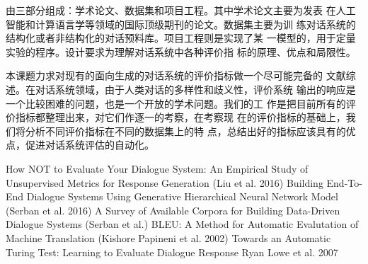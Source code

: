 
\assignReq
{由三部分组成：学术论文、数据集和项目工程。其中学术论文主要为发表}
{在人工智能和计算语言学等领域的国际顶级期刊的论文。数据集主要为训}
{练对话系统的结构化或者非结构化的对话预料库。项目工程则是实现了某}
{一模型的，用于定量实验的程序。设计要求为理解对话系统中各种评价指}
{标的原理、优点和局限性。}

\assignWork
{本课题力求对现有的面向生成的对话系统的评价指标做一个尽可能完备的}
{文献综述。在对话系统领域，由于人类对话的多样性和歧义性，评价系统}
{输出的响应是一个比较困难的问题，也是一个开放的学术问题。我们的工}
{作是把目前所有的评价指标都整理出来，对它们作逐一的考察，在考察现}
{在的评价指标的基础上，我们将分析不同评价指标在不同的数据集上的特}
{点，总结出好的指标应该具有的优点，促进对话系统评估的自动化。}

\assignRef
{How NOT to Evaluate Your Dialogue System: An Empirical Study of Unsupervised}
{Metrics for Response Generation (Liu et al. 2016)}
{Building End-To-End Dialogue Systems Using Generative Hierarchical Neural}
{Network Model (Serban et al. 2016)}
{A Survey of Available Corpora for Building Data-Driven Dialogue Systems}
{(Serban et al.)}
{BLEU: A Method for Automatic Evalutation of Machine Translation}
{(Kishore Papineni et al. 2002)}
{Towards an Automatic Turing Test: Learning to Evaluate Dialogue Response}
{Ryan Lowe et al. 2007}
